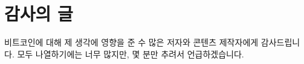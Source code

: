 \chapter*{감사의 글}

비트코인에 대해 제 생각에 영향을 준 수 많은 저자와 콘텐츠 제작자에게 감사드립니다.
모두 나열하기에는 너무 많지만, 몇 분만 추려서 언급하겠습니다.


\begin{itemize}
	\begin{comment}
		\item Thanks to Arjun Balaji for the tweet which motivated me to write this.
		\item Thanks to Marty Bent for providing endless food for thought and entertainment. If you are not subscribed to Marty’s Bent and Tales From The Crypt, you are missing out. Cheers Matt and Marty for guiding us through the rabbit hole.
		\item Thanks to Michael Goldstein and Pierre Rochard for curating and providing the greatest Bitcoin literature via the Nakamoto Institute. And thank you for creating the Noded Podcast which influenced my philosophical views on Bitcoin substantially.
		\item Thanks to Saifedean Ammous for his convictions, savage tweets, and writing The Bitcoin Standard
		\item Thanks to Francis Pouliot for sharing his excitement about finding out about the timechain.
		\item Thanks to Andreas M. Antonopoulos for all the educational material he has put out over the years.
		\item Thanks to Peter McCormack for his honest tweets and the What Bitcoin Did podcast, which keeps providing great insights from many areas of the space.
		\item Thanks to Jannik, Brandon, Matt, Camilo, Daniel, Michael, and Raphael for providing feedback to early drafts of some lessons. Special thanks to Jannik who proofread multiple drafts multiple times.
		\item Thanks to Dhruv Bansal and Matt Odell for taking the time to discuss some of these ideas with me.
		\item Thanks to Guy Swann for producing an audio version of 21lessons.com.
		\item Thanks to Friar Hass for his spiritual support and guidance, and for taking the time to write a foreword for this book.

\end{comment}
\end{itemize}
